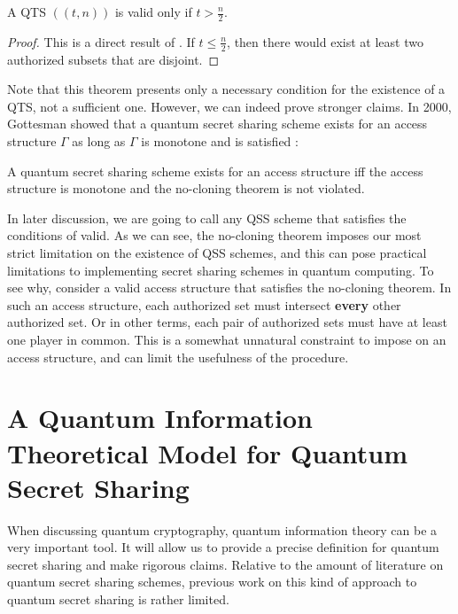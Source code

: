 \begin{corollary}
    \label{cor:qts}
    A QTS $((t,n))$ is valid only if $t > \frac{n}{2}$.
\end{corollary}

\begin{proof}
    This is a direct result of . If $t \leq \frac{n}{2}$, then there would exist at least two authorized subsets that are disjoint. 
\end{proof}

Note that this theorem presents only a necessary condition for the existence of a QTS, not a sufficient one. However, we can indeed prove stronger claims. In 2000, Gottesman showed that a quantum secret sharing scheme exists for an access structure $\Gamma$ as long as $\Gamma$ is monotone and  is satisfied \cite{gottesman_theory_2000}:

\begin{theorem}
    \label{thm:monotone-gamma}
    A quantum secret sharing scheme exists for an access structure iff the access structure is monotone and the no-cloning theorem is not violated.
\end{theorem}

In later discussion, we are going to call any QSS scheme that satisfies the conditions of  valid. As we can see, the no-cloning theorem imposes our most strict limitation on the existence of QSS schemes, and this can pose practical limitations to implementing secret sharing schemes in quantum computing. To see why, consider a valid access structure that satisfies the no-cloning theorem. In such an access structure, each authorized set must intersect \textbf{every} other authorized set. Or in other terms, each pair of authorized sets must have at least one player in common. This is a somewhat unnatural constraint to impose on an access structure, and can limit the usefulness of the procedure.

\section{A Quantum Information Theoretical Model for Quantum Secret Sharing}

When discussing quantum cryptography, quantum information theory can be a very important tool. It will allow us to provide a precise definition for quantum secret sharing and make rigorous claims. Relative to the amount of literature on quantum secret sharing schemes, previous work on this kind of approach to quantum secret sharing is rather limited.

